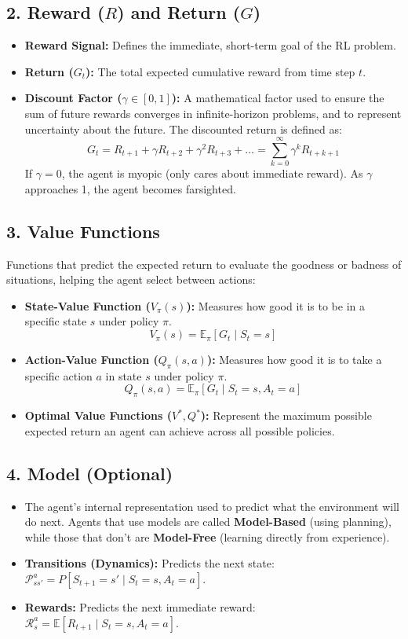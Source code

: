 \documentclass[12pt]{article}
\begin{document}
\subsection*{2. Reward ($R$) and Return ($G$)}
\begin{itemize}[label=$\bullet$]
    \item \textbf{Reward Signal:} Defines the immediate, short-term goal of the RL problem. 
    \item \textbf{Return ($G_t$):} The total expected cumulative reward from time step $t$.
    \item \textbf{Discount Factor ($\gamma \in [0, 1]$):} A mathematical factor used to ensure the sum of future rewards converges in infinite-horizon problems, and to represent uncertainty about the future. The discounted return is defined as:
    $$G_t = R_{t+1} + \gamma R_{t+2} + \gamma^2 R_{t+3} + \dots = \sum_{k=0}^{\infty} \gamma^k R_{t+k+1}$$
    If $\gamma = 0$, the agent is myopic (only cares about immediate reward). As $\gamma$ approaches 1, the agent becomes farsighted.
\end{itemize}

\subsection*{3. Value Functions}
Functions that predict the expected return to evaluate the goodness or badness of situations, helping the agent select between actions:
\begin{itemize}[label=$\bullet$]
    \item \textbf{State-Value Function ($V_\pi(s)$):} Measures how good it is to be in a specific state $s$ under policy $\pi$.
    $$V_\pi(s) = \mathbb{E}_\pi [G_t \mid S_t = s]$$
    \item \textbf{Action-Value Function ($Q_\pi(s, a)$):} Measures how good it is to take a specific action $a$ in state $s$ under policy $\pi$.
    $$Q_\pi(s, a) = \mathbb{E}_\pi [G_t \mid S_t = s, A_t = a]$$
    \item \textbf{Optimal Value Functions ($V^*, Q^*$):} Represent the maximum possible expected return an agent can achieve across all possible policies.
\end{itemize}

\subsection*{4. Model (Optional)}
\begin{itemize}[label=$\bullet$]
    \item The agent's internal representation used to predict what the environment will do next. Agents that use models are called \textbf{Model-Based} (using planning), while those that don't are \textbf{Model-Free} (learning directly from experience).
    \item \textbf{Transitions (Dynamics):} Predicts the next state: $\mathcal{P}_{ss'}^a = P[S_{t+1}=s' \mid S_t=s, A_t=a]$.
    \item \textbf{Rewards:} Predicts the next immediate reward: $\mathcal{R}_s^a = \mathbb{E}[R_{t+1} \mid S_t=s, A_t=a]$.
\end{itemize}
\end{document}
